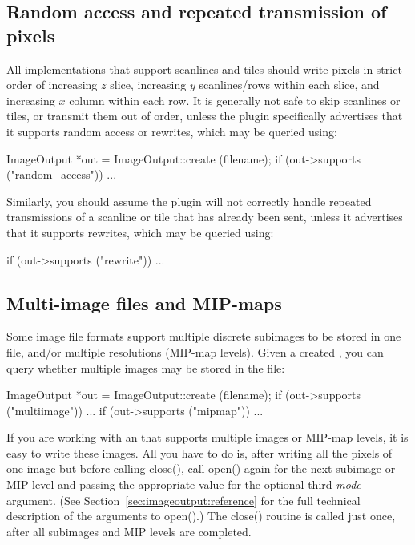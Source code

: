 \subsection{Random access and repeated transmission of pixels}
\label{sec:imageoutput:randomrewrite}

All \ImageOutput implementations that support scanlines and tiles should write pixels in strict
order of increasing $z$ slice, increasing $y$ scanlines/rows within each
slice, and increasing $x$ column within each row.  It is generally not
safe to skip scanlines or tiles, or transmit them out of order, unless
the plugin specifically advertises that it supports random access or
rewrites, which may be queried using:

\begin{code}
        ImageOutput *out = ImageOutput::create (filename);
        if (out->supports ("random_access"))
            ...
\end{code}

\noindent Similarly, you should assume the plugin will not correctly
handle repeated transmissions of a scanline or tile that has already
been sent, unless it advertises that it supports rewrites, which may be
queried using:

\begin{code}
        if (out->supports ("rewrite"))
            ...
\end{code}


\subsection{Multi-image files and MIP-maps}
\label{sec:imageoutput:multiimage}
\label{sec:imageoutput:mipmap}

Some image file formats support multiple discrete subimages to be stored
in one file, and/or multiple resolutions (MIP-map levels).  Given a
created \ImageOutput, you can query whether multiple images may be
stored in the file:

\begin{code}
        ImageOutput *out = ImageOutput::create (filename);
        if (out->supports ("multiimage"))
            ...
        if (out->supports ("mipmap"))
            ...
\end{code}

If you are working with an \ImageOutput that supports multiple images
or MIP-map levels,
it is easy to write these images.  All you have to do is, after writing
all the pixels of one image but before calling {\cf close()}, call {\cf
  open()} again for the next subimage or MIP level and passing the
appropriate value for the optional third
\emph{mode} argument.  (See
Section~\ref{sec:imageoutput:reference} for the full technical
description of the arguments to {\cf open()}.)  The {\cf close()}
routine is called just once, after all subimages and MIP levels are completed.

